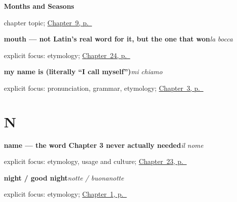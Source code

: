 \noindent\begin{minipage}[t]{\linewidth}
\raggedright
\textbf{Months and Seasons}\par
\footnotesize chapter topic; \hyperref[ch:it-months-and-seasons]{Chapter~9, p.~\pageref*{ch:it-months-and-seasons}}
\end{minipage}\par\smallskip

\noindent\begin{minipage}[t]{\linewidth}
\raggedright
\textbf{mouth — not Latin's real word for it, but the one that won}\enspace\emph{la bocca}\par
\footnotesize explicit focus: etymology; \hyperref[ch:it-heart-eyes-ears-mouth]{Chapter~24, p.~\pageref*{ch:it-heart-eyes-ears-mouth}}
\end{minipage}\par\smallskip

\noindent\begin{minipage}[t]{\linewidth}
\raggedright
\textbf{my name is (literally \textquotedblleft{}I call myself\textquotedblright{})}\enspace\emph{mi chiamo}\par
\footnotesize explicit focus: pronunciation, grammar, etymology; \hyperref[ch:it-introductions]{Chapter~3, p.~\pageref*{ch:it-introductions}}
\end{minipage}\par\smallskip

\section*{N}

\noindent\begin{minipage}[t]{\linewidth}
\raggedright
\textbf{name — the word Chapter 3 never actually needed}\enspace\emph{il nome}\par
\footnotesize explicit focus: etymology, usage and culture; \hyperref[ch:it-friends-family-name]{Chapter~23, p.~\pageref*{ch:it-friends-family-name}}
\end{minipage}\par\smallskip

\noindent\begin{minipage}[t]{\linewidth}
\raggedright
\textbf{night / good night}\enspace\emph{notte / buonanotte}\par
\footnotesize explicit focus: etymology; \hyperref[ch:greetings]{Chapter~1, p.~\pageref*{ch:greetings}}
\end{minipage}\par\smallskip

